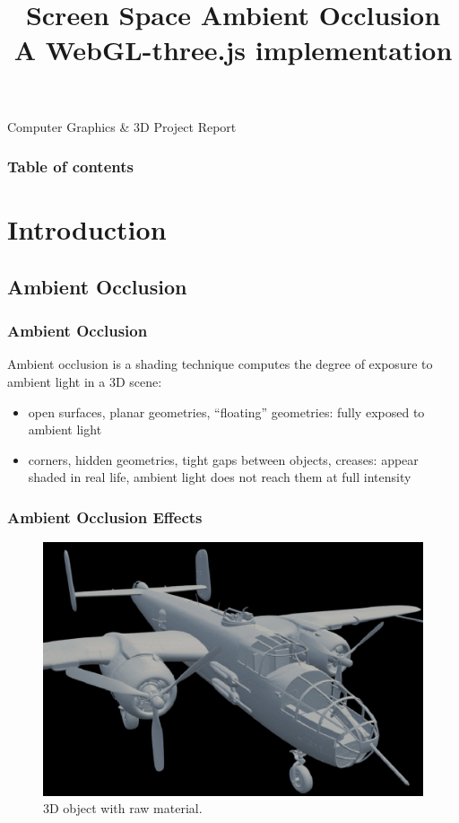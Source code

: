 \documentclass{beamer}
\title[]{Screen Space Ambient Occlusion \\\small A WebGL-three.js implementation}
\author[Ivan Prosperi]{
    \texorpdfstring{\usebox{\authbox}}{Ivan Prosperi}}
\institute[]{Universit\`a degli Studi di Firenze}
\date{}
\begin{document}

\begin{frame}
    \titlepage
    \centering
    Computer Graphics \& 3D Project Report
\end{frame}

\begin{frame}
    \frametitle{Table of contents}
    \tableofcontents[subsubsectionstyle=hide]
\end{frame}

\section{Introduction}

\subsection{Ambient Occlusion}

\begin{frame}
\frametitle{Ambient Occlusion}
Ambient occlusion is a shading technique computes the degree of exposure to ambient light in a 3D scene:
\begin{itemize}
    \item open surfaces, planar geometries, ``floating'' geometries: fully exposed to ambient light
    \item corners, hidden geometries, tight gaps between objects, creases: appear shaded in real life, ambient light does not reach them at full intensity
\end{itemize}

\end{frame}

\begin{frame}
\frametitle{Ambient Occlusion Effects}
\begin{figure}
    \centering
    \includegraphics[width=0.8\linewidth]{images/B-25_raw.png}
    \caption{3D object with raw material.\footnotemark}
\end{figure}

\vspace*{-8px}
\end{frame}
\end{document}
